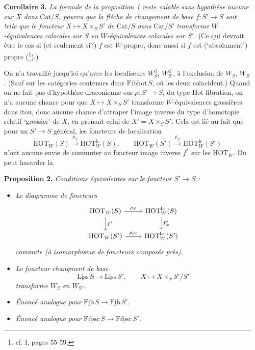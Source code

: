 \documentclass[11pt]{article}
\newcommand{\printedpage}[1]{\marginpar{\footnotesize p.~#1}}
\newcommand{\msp}[1]{\marginpar{\footnotesize [#1]}}
\newcommand{\HOT}{\mathrm{HOT}}
\newcommand{\Cat}{\mathrm{Cat}}
\newcommand{\und}[1]{\underline{\mathrm{#1}}}
\begin{document}
\textbf{Corollaire 3.} \textit{La formule de la proposition 1 reste valable sans hypothèse aucune sur $X$ dans} $\Cat/S$\textit{, pourvu que la flèche de changement de base $f : S' \longrightarrow S$ soit telle que le foncteur $X \longmapsto X \times_S S'$ de} $\Cat/S$ \textit{dans} $\Cat/S'$
\msp{page 123}
\textit{transforme $W$-équivalences colocales sur $S$ en $W$-équivalences colocales sur $S'$.} (Ce qui devrait être le cas si (et seulement si?) $f$ est $W$-propre, donc aussi si $f$ est (`absolument') propre (\footnote[62]{cf. I, pages 55-59.}).)

On n'a travaillé jusqu'ici qu'avec les localiseurs $W_S^{\mathrm{d}}$, $W_{S'}^{\mathrm{d}}$, à l'exclusion de $W_S$, $W_{S'}$. (Sauf sur les catégories contenues dans $\und{Fibhot}\,S$, où les deux coïncident.) Quand on ne fait pas d'hypothèse draconienne sur $p : S' \longrightarrow S$, du type Hot-fibration, on n'a aucune chance pour que $X \longmapsto X \times_S S'$ transforme $W$-équivalences grossières dans itou, donc aucune chance d'attraper l'image inverse du type d'homotopie relatif `grossier' de $X$, en prenant celui de $X' = X \times_S S'$. Cela est lié au fait que pour un $S' \longrightarrow S$ général, les foncteurs de localisation
\[
\HOT_W(S) \xrightarrow{\rho_S} \HOT_W^{\mathrm{lc}}(S), \qquad \HOT_W(S') \xrightarrow{\rho_{S'}} \HOT_W^{\mathrm{lc}}(S')
\]
n'ont aucune envie de commuter au foncteur image inverse $f^*$ sur les $\HOT_W$. On peut hasarder la

\textbf{Proposition 2.} \textit{Conditions équivalentes sur le foncteur $S' \longrightarrow S$ :}

\begin{itemize}
\item[\textit{a)}] \textit{Le diagramme de foncteurs}
\[
\begin{tikzcd}
\HOT_W(S) \arrow[r, "\rho_S"] \arrow[d, "f^*"] & \HOT_W^{\mathrm{lc}}(S) \arrow[d, "f^*_{\mathrm{lc}}"] \\
\HOT_W(S') \arrow[r, "\rho_{S'}"] & \HOT_W^{\mathrm{lc}}(S')
\end{tikzcd}
\]
\textit{commute (à isomorphisme de foncteurs composés près).}

\msp{page 124}

\item[\textit{b)}] \textit{Le foncteur changment de base} %
\[
\und{Liss}\,S \longrightarrow \und{Liss}\,S', \qquad X \longmapsto X \times_S S'/S'
\]
\textit{transforme $W_S$ en $W_{S'}$.}
\printedpage{77}
\item[\textit{b$'$)}] \textit{Énoncé analogue pour} $\und{Fib}\,S \longrightarrow \und{Fib}\,S'$\textit{.}
\item[\textit{b$''$)}] \textit{Énoncé analogue pour} $\und{Fibsc}\,S \longrightarrow \und{Fibsc}\,S'$\textit{.}
\end{itemize}
\end{document}

